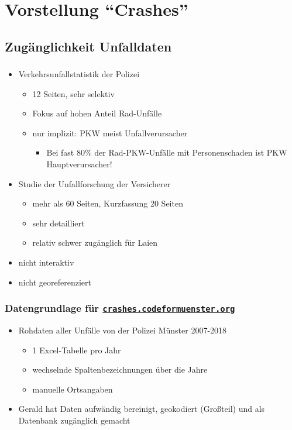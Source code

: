\documentclass{beamer}
\begin{document}
\section{Vorstellung "`Crashes"'}

\subsection{Zugänglichkeit Unfalldaten}

\begin{frame}
  \frametitle{\subsecname}
  
  \begin{itemize}
    \item Verkehrsunfallstatistik der Polizei \cite{Polizei2019}
    \begin{itemize}
      \item 12 Seiten, sehr selektiv
      \item Fokus auf hohen Anteil Rad-Unfälle
      \item nur implizit: PKW meist Unfallverursacher
      \begin{itemize}
        \item Bei fast 80\% der Rad-PKW-Unfälle mit Personenschaden ist PKW Hauptverursacher!
      \end{itemize}
    \end{itemize}
      \pause
    \item Studie der Unfallforschung der Versicherer \cite{Baier2018}
    \begin{itemize}
      \item mehr als 60 Seiten, Kurzfassung 20 Seiten
      \item sehr detailliert
      \item relativ schwer zugänglich für Laien
    \end{itemize}
    \pause
    \item nicht interaktiv
    \item nicht georeferenziert
  \end{itemize}
\end{frame}

\begin{frame}
  \frametitle{Datengrundlage für \href{https://crashes.codeformuenster.org}{\texttt{crashes.codeformuenster.org}}}
  
  \begin{itemize}
    \item Rohdaten aller Unfälle von der Polizei Münster 2007-2018
    \begin{itemize}
      \item 1 Excel-Tabelle pro Jahr
      \item wechselnde Spaltenbezeichnungen über die Jahre
      \item manuelle Ortsangaben
    \end{itemize}
    \pause
    \item Gerald hat Daten aufwändig bereinigt, geokodiert (Großteil) und als Datenbank zugänglich gemacht
  \end{itemize}  
\end{frame}
\end{document}
